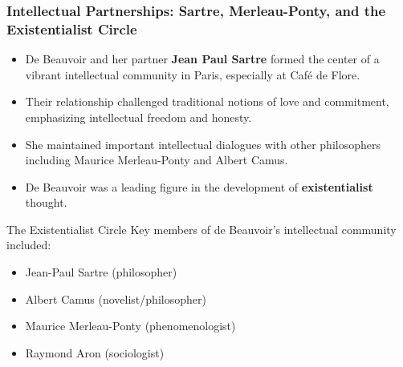 \documentclass[aspectratio=169]{beamer}
\begin{document}
	\begin{frame}
		\frametitle{Intellectual Partnerships: Sartre, Merleau-Ponty, and the Existentialist Circle}
		\begin{itemize}
			\item De Beauvoir and her partner \textbf{Jean Paul Sartre} formed the center of a vibrant intellectual community in Paris, especially at Café de Flore.
			\item Their relationship challenged traditional notions of love and commitment, emphasizing intellectual freedom and honesty.
			\item She maintained important intellectual dialogues with other philosophers including Maurice Merleau-Ponty and Albert Camus.
			\item De Beauvoir was a leading figure in the development of \textbf{existentialist} thought.
		\end{itemize}
		
		\begin{block}{The Existentialist Circle}
			\scriptsize
			Key members of de Beauvoir's intellectual community included:
			\begin{itemize}
				\item Jean-Paul Sartre (philosopher)
				\item Albert Camus (novelist/philosopher) 
				\item Maurice Merleau-Ponty (phenomenologist)
				\item Raymond Aron (sociologist)
			\end{itemize}
		\end{block}
	\end{frame}
	
\end{document}
